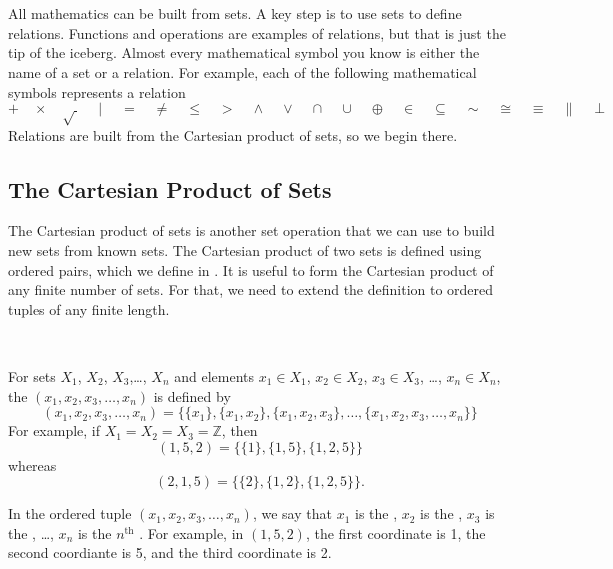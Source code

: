 \section{\secrel}
\label{sec_relations}

All mathematics can be built from sets. A key step is to use sets to define relations.  Functions and operations are examples of relations, but that is just the tip of the iceberg. Almost every mathematical symbol you know is either the name of a set or a relation. For example, each of the following mathematical symbols represents a relation
    $$+ \quad \times \quad \sqrt{~} \quad \mid \quad = \quad \neq \quad \le \quad > \quad \land \quad \lor \quad \cap \quad \cup \quad \oplus \quad \in \quad \subseteq \quad \sim \quad \cong \quad \equiv  \quad \| \quad \perp$$
Relations are built from the Cartesian product of sets, so we begin there.  

\newcommand{\subcartprod}{The Cartesian Product of Sets}
\subsection{\subcartprod}
\label{sub_cart_prod}

The Cartesian product of sets is another set operation that we can use to build new sets from known sets. The Cartesian product of two sets is defined using ordered pairs, which we define in . It is useful to form the Cartesian product of any finite number of sets. For that, we need to extend the definition to ordered tuples of any finite length.

\begin{defn}
\label{defn_ordered_tuple}
~
    \begin{apart}
        \item For sets $X_1$, $X_2$, $X_3$,\ldots, $X_n$ and elements $x_1\in X_1$, $x_2\in X_2$, $x_3\in X_3$, \ldots, $x_n\in X_n$, the  $(x_1,x_2,x_3, \ldots, x_n)$ is defined by 
            $$(x_1,x_2, x_3, \ldots, x_n) = \{\{x_1\}, \{x_1,x_2\}, \{x_1,x_2,x_3\}, \ldots, \{x_1,x_2,x_3,\ldots, x_n\}\}$$
        For example, if $X_1=X_2=X_3=\mathbb{Z}$, then      \
            $$(1,5,2) = \{\{1\}, \{1,5\}, \{1,2,5\}\}$$ 
        whereas 
            $$(2,1,5) = \{\{2\}, \{1,2\}, \{1,2,5\}\}.$$
        \item In the ordered tuple $(x_1,x_2,x_3, \ldots, x_n)$, we say that $x_1$ is the , $x_2$ is the , $x_3$ is the , \ldots, $x_n$ is the $n^{\text{th}}$ .  For example, in $(1,5,2)$, the first coordinate is 1, the second coordiante is 5, and the third coordinate is 2.
    \end{apart}
\end{defn}

